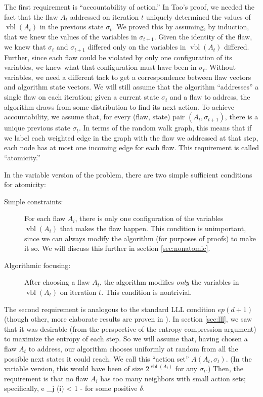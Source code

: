 \documentclass[twocolumn]{article}
\def\seqn#1\eeqn{\begin{align}#1\end{align}}
\begin{document}
The first requirement is ``accountability of action.''  In Tao's proof, we needed the fact that the flaw $A_t$ addressed on iteration $t$ uniquely determined the values of $\operatorname{vbl}(A_t)$ in the previous state $\sigma_t$.  We proved this by assuming, by induction, that we knew the values of the variables in $\sigma_{t+1}$.  Given the identity of the flaw, we knew that $\sigma_t$ and $\sigma_{t+1}$ differed only on the variables in $\operatorname{vbl}(A_t)$ differed.  Further, since each flaw could be violated by only one configuration of its variables, we knew what that configuration must have been in $\sigma_t$.  Without variables, we need a different tack to get a correspondence between flaw vectors and algorithm state vectors.  We will still assume that the algorithm ``addresses'' a single flaw on each iteration; given a current state $\sigma_t$ and a flaw to address, the algorithm draws from some distribution to find its next action.  To achieve accountability, we assume that, for every (flaw, state) pair $(A_{t}, \sigma_{t+1})$, there is a unique previous state $\sigma_t$.  In terms of the random walk graph, this means that if we label each weighted edge in the graph with the flaw we addressed at that step, each node has at most one incoming edge for each flaw.  This requirement is called ``atomicity.''

In the variable version of the problem, there are two simple sufficient conditions for atomicity:
\begin{description}
  \item[Simple constraints:] For each flaw $A_i$, there is only one configuration of the variables $\operatorname{vbl}(A_i)$ that makes the flaw happen.  This condition is unimportant, since we can always modify the algorithm (for purposes of proofs) to make it so.  We will discuss this further in section \ref{sec:nonatomic}.
  \item[Algorithmic focusing:] After choosing a flaw $A_t$, the algorithm modifies \emph{only} the variables in $\operatorname{vbl}(A_t)$ on iteration $t$.  This condition is nontrivial.
\end{description}

The second requirement is analogous to the standard LLL condition $e p (d+1)$ (though other, more elaborate results are proven in \cite{achlioptas2014random}).  In section \ref{sec:lll}, we saw that it was desirable (from the perspective of the entropy compression argument) to maximize the entropy of each step.  So we will assume that, having chosen a flaw $A_t$ to address, our algorithm chooses uniformly at random from all the possible next states it could reach.  We call this ``action set'' $A(A_t, \sigma_t)$.  (In the variable version, this would have been of size $2^{\operatorname{vbl}(A_t)}$ for any $\sigma_t$.)  Then, the requirement is that no flaw $A_i$ has too many neighbors with small action sets; specifically,
\seqn
  \label{eqn:degree-req}
  e \sum_{j \in \Gamma(i)}  < 1 - \delta
\eeqn
for some positive $\delta$.
\end{document}
